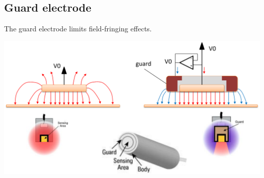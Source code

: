 \documentclass[11pt]{article}
\begin{document}
\subsection{Guard electrode}
\label{sec:org03c743b}
The guard electrode limits field-fringing effects.
\begin{center}
\includegraphics[width=.9\linewidth]{./images/guard-electrode.png}
\end{center}
\end{document}

